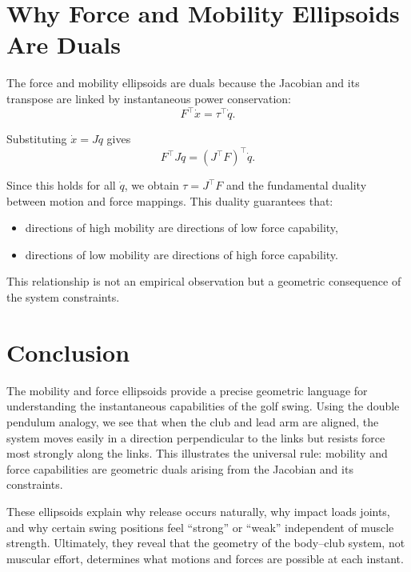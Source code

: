 \documentclass[12pt]{article}
\begin{document}
\section{Why Force and Mobility Ellipsoids Are Duals}

The force and mobility ellipsoids are duals because the Jacobian and its 
transpose are linked by instantaneous power conservation:
\[
    F^\top \dot{x} = \tau^\top \dot{q}.
\]

Substituting $\dot{x} = J\dot{q}$ gives
\[
    F^\top J \dot{q} = (J^\top F)^\top \dot{q}.
\]

Since this holds for all $\dot{q}$, we obtain $\tau = J^\top F$ and the 
fundamental duality between motion and force mappings.  
This duality guarantees that:

\begin{itemize}
    \item directions of high mobility are directions of low force capability,
    \item directions of low mobility are directions of high force capability.
\end{itemize}

This relationship is not an empirical observation but a geometric consequence of 
the system constraints.

\section{Conclusion}

The mobility and force ellipsoids provide a precise geometric language for 
understanding the instantaneous capabilities of the golf swing.  
Using the double pendulum analogy, we see that when the club and lead arm are 
aligned, the system moves easily in a direction perpendicular to the links but 
resists force most strongly along the links.  
This illustrates the universal rule: mobility and force capabilities are 
geometric duals arising from the Jacobian and its constraints.  

These ellipsoids explain why release occurs naturally, why impact loads joints, 
and why certain swing positions feel ``strong'' or ``weak'' independent of muscle 
strength.  
Ultimately, they reveal that the geometry of the body--club system, not muscular 
effort, determines what motions and forces are possible at each instant.
\end{document}
